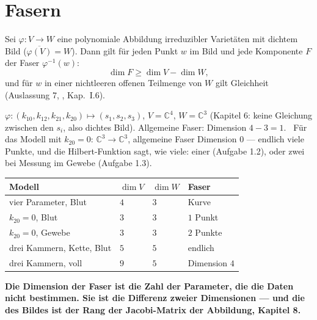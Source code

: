 \section{Fasern}

\begin{merksatz}
Sei $\varphi\colon V\to W$ eine polynomiale Abbildung irreduzibler Varietäten mit dichtem Bild ($\overline{\varphi(V)} = W$). Dann gilt für jeden Punkt $w$ im Bild und jede Komponente $F$ der Faser $\varphi^{-1}(w)$:
\[ \dim F\ge\dim V - \dim W, \]
und für $w$ in einer nichtleeren offenen Teilmenge von $W$ gilt Gleichheit (Auslassung 7, , Kap.~I.6).

$\varphi\colon(k_{10}, k_{12}, k_{21}, k_{20})\mapsto(s_1, s_2, s_3)$, $V = \mathbb C^{4}$, $W = \mathbb C^{3}$ (Kapitel 6: keine Gleichung zwischen den $s_i$, also dichtes Bild). Allgemeine Faser: Dimension $4 - 3 = 1$. \checkmark\ Für das Modell mit $k_{20} = 0$: $\mathbb C^{3}\to\mathbb C^{3}$, allgemeine Faser Dimension $0$ --- endlich viele Punkte, und die Hilbert-Funktion sagt, wie viele: einer (Aufgabe 1.2), oder zwei bei Messung im Gewebe (Aufgabe 1.3).

\begin{center}
{\small
\renewcommand{\arraystretch}{1.5}
\begin{tabular}{@{}P{3.2cm}P{1.6cm}P{1.6cm}P{2.0cm}@{}}
\toprule
\textbf{Modell} & $\dim V$ & $\dim W$ & \textbf{Faser}\\
\midrule
vier Parameter, Blut & $4$ & $3$ & Kurve\\
$k_{20} = 0$, Blut & $3$ & $3$ & $1$ Punkt\\
$k_{20} = 0$, Gewebe & $3$ & $3$ & $2$ Punkte\\
drei Kammern, Kette, Blut & $5$ & $5$ & endlich\\
drei Kammern, voll & $9$ & $5$ & Dimension $4$\\
\bottomrule
\end{tabular}}
\end{center}

\begin{center}
\begin{minipage}{0.9\textwidth}
\textbf{Die Dimension der Faser ist die Zahl der Parameter, die die Daten nicht bestimmen. Sie ist die Differenz zweier Dimensionen --- und die des Bildes ist der Rang der Jacobi-Matrix der Abbildung, Kapitel 8.}
\end{minipage}
\end{center}


\end{merksatz}
